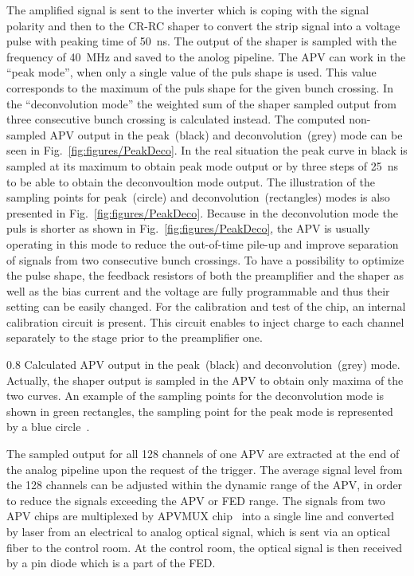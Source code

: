 The amplified signal is sent to the inverter which is coping with the signal polarity and then to the CR-RC shaper to convert the strip signal into a voltage pulse with peaking time of 50~ns. The output of the shaper is sampled with the frequency of 40~MHz and saved to the anolog pipeline. The APV can work in the ``peak mode'', when only a single value of the puls shape is used. This value corresponds to the maximum of the puls shape for the given bunch crossing. In the ``deconvolution mode'' the weighted sum of the shaper sampled output from three consecutive bunch crossing is calculated instead. The computed non-sampled APV output in the peak~(black) and deconvolution~(grey) mode can be seen in Fig.~\ref{fig:figures/PeakDeco}. In the real situation the peak curve in black is sampled at its maximum to obtain peak mode output or by three steps of 25~ns to be able to obtain the deconvoultion mode output. The illustration of the sampling points for peak~(circle) and deconvolution~(rectangles) modes is also presented in Fig.~\ref{fig:figures/PeakDeco}. Because in the deconvolution mode the puls is shorter as shown in Fig.~\ref{fig:figures/PeakDeco}, the APV is usually operating in this mode to reduce the out-of-time pile-up and improve separation of signals from two consecutive bunch crossings. To have a possibility to optimize the pulse shape, the feedback resistors of both the preamplifier and the shaper as well as the bias current and the voltage are fully programmable and thus their setting can be easily changed. For the calibration and test of the chip, an internal calibration circuit is present. This circuit enables to inject charge to each channel separately to the stage prior to the preamplifier one.


                 {0.8}       %
                 {Calculated APV output in the peak~(black) and deconvolution~(grey) mode. Actually, the shaper output is sampled in the APV to obtain only maxima of the two curves. An example of the sampling points for the deconvolution mode is shown in green rectangles, the sampling point for the peak mode is represented by a blue circle~\cite{Friedl:2001kra}.} %


The sampled output for all 128 channels of one APV are extracted at the end of the analog pipeline upon the request of the trigger. The average signal level from the 128 channels can be adjusted within the dynamic range of the APV, in order to reduce the signals exceeding the APV or FED range. The signals from two APV chips are multiplexed by APVMUX chip~\cite{Ball:2007zza} into a single line and converted by laser from an electrical to analog optical signal, which is sent via an optical fiber to the control room. At the control room, the optical signal is then received by a pin diode which is a part of the FED.

